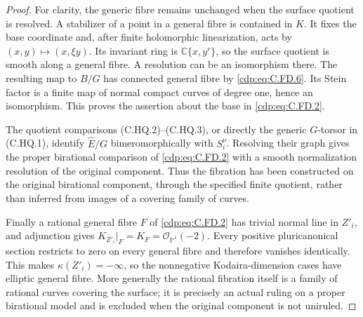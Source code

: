 \begin{proof}
For clarity, the generic fibre remains unchanged when the
surface quotient is resolved. A stabilizer of a point in a
general fibre is contained in $K$. It fixes the base coordinate
and, after finite holomorphic linearization, acts by
$(x,y)\mapsto(x,\xi y)$. Its invariant ring is
$\mathbb C\{x,y^r\}$, so the surface quotient is smooth
along a general fibre. A resolution can be an isomorphism
there. The resulting map to $B/G$ has connected general
fibre by \eqref{cdp:eq:C.FD.6}. Its Stein factor is a finite map of normal
compact curves of degree one, hence an isomorphism. This
proves the assertion about the base in \eqref{cdp:eq:C.FD.2}.

The quotient comparisons (C.HQ.2)--(C.HQ.3), or directly
the generic $G$-torsor in (C.HQ.1), identify
$\widehat E/G$ bimeromorphically with $S_i^\nu$.
Resolving their graph gives the proper birational comparison
of \eqref{cdp:eq:C.FD.2} with a smooth normalization resolution of the
original component. Thus the fibration has been constructed
on the original birational component, through the specified
finite quotient, rather than inferred from images of a
covering family of curves.

Finally a rational general fibre $F$ of \eqref{cdp:eq:C.FD.2} has trivial
normal line in $Z'_i$, and adjunction gives
$K_{Z'_i}|_F=K_F=\mathcal O_{\mathbb P^1}(-2)$.
Every positive pluricanonical section restricts to zero on
every general fibre and therefore vanishes identically.
This makes $\kappa(Z'_i)=-\infty$, so the nonnegative
Kodaira-dimension cases have elliptic general fibre.
More generally the rational fibration itself is a family
of rational curves covering the surface; it is precisely
an actual ruling on a proper birational model and is
excluded when the original component is not uniruled.
\end{proof}


